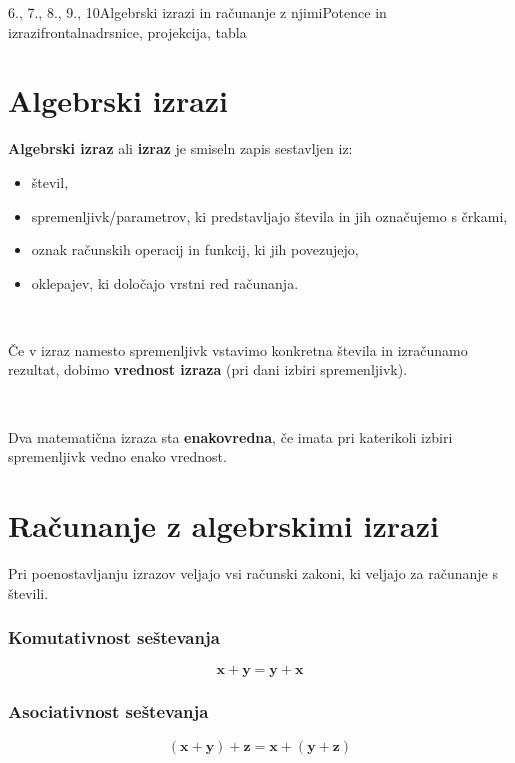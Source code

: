 \begin{priprava}{6., 7., 8., 9., 10}{}{Algebrski izrazi in računanje z njimi}{Potence in izrazi}{frontalna}{drsnice, projekcija, tabla}


    \section{Algebrski izrazi}
    
        
    
            
    \textbf{Algebrski izraz} ali \textbf{izraz} je smiseln zapis sestavljen iz:
    \begin{itemize}
        \item števil,
        \item spremenljivk/parametrov, ki predstavljajo števila in jih označujemo s črkami,
        \item oznak računskih operacij in funkcij, ki jih povezujejo,
        \item oklepajev, ki določajo vrstni red računanja. 
    \end{itemize}
~


    Če v izraz namesto spremenljivk vstavimo konkretna števila in izračunamo rezultat, dobimo \textbf{vrednost izraza} (pri dani izbiri spremenljivk).

~


    Dva matematična izraza sta \textbf{enakovredna}, če imata pri katerikoli izbiri spremenljivk vedno enako vrednost.





\section{Računanje z algebrskimi izrazi}





    Pri poenostavljanju izrazov veljajo vsi računski zakoni, ki veljajo za računanje s števili.

    \begin{multicols}{2}

    \subsubsection*{Komutativnost seštevanja}
        $$ \mathbf{x+ y=y+ x}$$
    

        \subsubsection*{Asociativnost seštevanja}
        $$ \mathbf{(x+ y)+ z=x+ (y+ z)}$$
    



\end{multicols}
\end{priprava}
